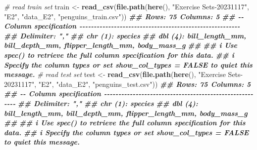 \documentclass[
]{article}
\newenvironment{Shaded}{\begin{snugshade}}{\end{snugshade}}
\newcommand{\CommentTok}[1]{\textcolor[rgb]{0.56,0.35,0.01}{\textit{#1}}}
\newcommand{\DocumentationTok}[1]{\textcolor[rgb]{0.56,0.35,0.01}{\textbf{\textit{#1}}}}
\newcommand{\FunctionTok}[1]{\textcolor[rgb]{0.13,0.29,0.53}{\textbf{#1}}}
\newcommand{\NormalTok}[1]{#1}
\newcommand{\OtherTok}[1]{\textcolor[rgb]{0.56,0.35,0.01}{#1}}
\newcommand{\StringTok}[1]{\textcolor[rgb]{0.31,0.60,0.02}{#1}}
\begin{document}
\begin{Shaded}
\begin{Highlighting}[]
\CommentTok{\# read train set}
\NormalTok{train }\OtherTok{\textless{}{-}} 
  \FunctionTok{read\_csv}\NormalTok{(}\FunctionTok{file.path}\NormalTok{(}\FunctionTok{here}\NormalTok{(), }\StringTok{"Exercise Sets{-}20231117"}\NormalTok{, }\StringTok{"E2"}\NormalTok{, }\StringTok{"data\_E2"}\NormalTok{, }\StringTok{"penguins\_train.csv"}\NormalTok{))}
\DocumentationTok{\#\# Rows: 75 Columns: 5}
\DocumentationTok{\#\# {-}{-} Column specification {-}{-}{-}{-}{-}{-}{-}{-}{-}{-}{-}{-}{-}{-}{-}{-}{-}{-}{-}{-}{-}{-}{-}{-}{-}{-}{-}{-}{-}{-}{-}{-}{-}{-}{-}{-}{-}{-}{-}{-}{-}{-}{-}{-}{-}{-}{-}{-}{-}{-}{-}{-}{-}{-}{-}{-}}
\DocumentationTok{\#\# Delimiter: ","}
\DocumentationTok{\#\# chr (1): species}
\DocumentationTok{\#\# dbl (4): bill\_length\_mm, bill\_depth\_mm, flipper\_length\_mm, body\_mass\_g}
\DocumentationTok{\#\# }
\DocumentationTok{\#\# i Use \textasciigrave{}spec()\textasciigrave{} to retrieve the full column specification for this data.}
\DocumentationTok{\#\# i Specify the column types or set \textasciigrave{}show\_col\_types = FALSE\textasciigrave{} to quiet this message.}
\CommentTok{\# read test set}
\NormalTok{test }\OtherTok{\textless{}{-}} 
  \FunctionTok{read\_csv}\NormalTok{(}\FunctionTok{file.path}\NormalTok{(}\FunctionTok{here}\NormalTok{(), }\StringTok{"Exercise Sets{-}20231117"}\NormalTok{, }\StringTok{"E2"}\NormalTok{, }\StringTok{"data\_E2"}\NormalTok{, }\StringTok{"penguins\_test.csv"}\NormalTok{))}
\DocumentationTok{\#\# Rows: 75 Columns: 5}
\DocumentationTok{\#\# {-}{-} Column specification {-}{-}{-}{-}{-}{-}{-}{-}{-}{-}{-}{-}{-}{-}{-}{-}{-}{-}{-}{-}{-}{-}{-}{-}{-}{-}{-}{-}{-}{-}{-}{-}{-}{-}{-}{-}{-}{-}{-}{-}{-}{-}{-}{-}{-}{-}{-}{-}{-}{-}{-}{-}{-}{-}{-}{-}}
\DocumentationTok{\#\# Delimiter: ","}
\DocumentationTok{\#\# chr (1): species}
\DocumentationTok{\#\# dbl (4): bill\_length\_mm, bill\_depth\_mm, flipper\_length\_mm, body\_mass\_g}
\DocumentationTok{\#\# }
\DocumentationTok{\#\# i Use \textasciigrave{}spec()\textasciigrave{} to retrieve the full column specification for this data.}
\DocumentationTok{\#\# i Specify the column types or set \textasciigrave{}show\_col\_types = FALSE\textasciigrave{} to quiet this message.}
\end{Highlighting}
\end{Shaded}
\end{document}
